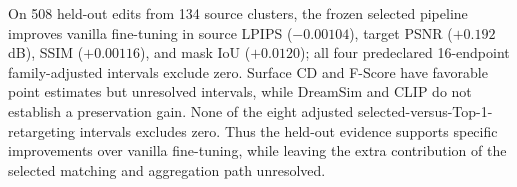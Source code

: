 On 508 held-out edits from 134 source clusters, the frozen selected pipeline
improves vanilla fine-tuning in source LPIPS ($-0.00104$), target PSNR
($+0.192$ dB), SSIM ($+0.00116$), and mask IoU ($+0.0120$); all four
predeclared 16-endpoint family-adjusted intervals exclude zero. Surface CD
and F-Score have favorable point estimates but unresolved intervals, while
DreamSim and CLIP do not establish a preservation gain. None of the eight
adjusted selected-versus-Top-1-retargeting intervals excludes zero. Thus the
held-out evidence supports specific improvements over vanilla fine-tuning,
while leaving the extra contribution of the selected matching and aggregation
path unresolved.
